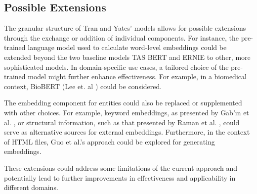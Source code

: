 \subsection{Possible Extensions}
The granular structure of Tran and Yates' models allows for possible extensions through the exchange or addition of individual components. For instance, the pre-trained language model used to calculate word-level embeddings could be extended beyond the two baseline models TAS BERT and ERNIE to other, more sophisticated models. In domain-specific use cases, a tailored choice of the pre-trained model might further enhance effectiveness. For example, in a biomedical context, BioBERT (Lee et. al \cite{lee2020biobert}) could be considered.

The embedding component for entities could also be replaced or supplemented with other choices. For example, keyword embeddings, as presented by Gab{'\i}n et al. \cite{gabin2023keyword}, or structural information, such as that presented by Raman et al. \cite{raman2022structure}, could serve as alternative sources for external embeddings. Furthermore, in the context of HTML files, Guo et al.'s approach \cite{guo2022webformer} could be explored for generating embeddings.

These extensions could address some limitations of the current approach and potentially lead to further improvements in effectiveness and applicability in different domains.




